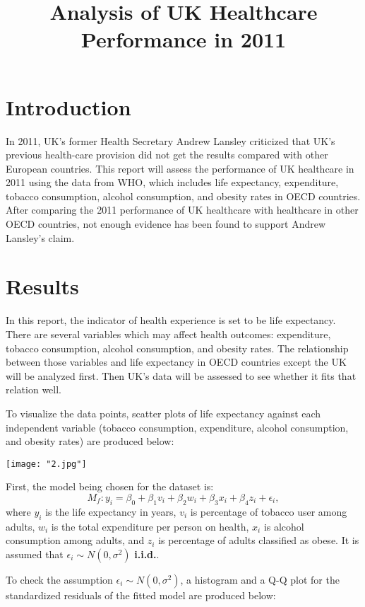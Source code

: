\documentclass[
]{article}
\title{Analysis of UK Healthcare Performance in 2011}
\author{}
\date{\vspace{-2.5em}}
\begin{document}
\maketitle

\hypertarget{introduction}{%
\section{Introduction}\label{introduction}}

In 2011, UK's former Health Secretary Andrew Lansley criticized that
UK's previous health-care provision did not get the results compared
with other European countries. This report will assess the performance
of UK healthcare in 2011 using the data from WHO, which includes life
expectancy, expenditure, tobacco consumption, alcohol consumption, and
obesity rates in OECD countries. After comparing the 2011 performance of
UK healthcare with healthcare in other OECD countries, not enough
evidence has been found to support Andrew Lansley's claim.

\hypertarget{results}{%
\section{Results}\label{results}}

In this report, the indicator of health experience is set to be life
expectancy. There are several variables which may affect health
outcomes: expenditure, tobacco consumption, alcohol consumption, and
obesity rates. The relationship between those variables and life
expectancy in OECD countries except the UK will be analyzed first. Then
UK's data will be assessed to see whether it fits that relation well.

To visualize the data points, scatter plots of life expectancy against
each independent variable (tobacco consumption, expenditure, alcohol
consumption, and obesity rates) are produced below:

\texttt{[image: "2.jpg"]}

First, the model being chosen for the dataset is:
\[M_f: y_i=\beta_0+\beta_1v_i+\beta_2w_i+\beta_3x_i+\beta_4z_i+\epsilon_i,\]
where \(y_i\) is the life expectancy in years, \(v_i\) is percentage of
tobacco user among adults, \(w_i\) is the total expenditure per person
on health, \(x_i\) is alcohol consumption among adults, and \(z_i\) is
percentage of adults classified as obese. It is assumed that
\(\epsilon_i \sim N(0,\sigma^2)\) \textbf{i.i.d.}.

To check the assumption \(\epsilon_i \sim N(0,\sigma^2)\), a histogram
and a Q-Q plot for the standardized residuals of the fitted model are
produced below:
\end{document}
